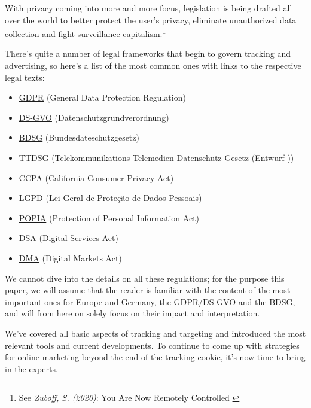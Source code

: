 With privacy coming into more and more focus, legislation is being drafted all over the world to better protect the user's privacy, eliminate unauthorized data collection and fight surveillance capitalism.\footnote{See \textit{Zuboff, S. (2020)}: You Are Now Remotely Controlled \cite{surveillance}} 

There's quite a number of legal frameworks that begin to govern tracking and advertising, so here's a list of the most common ones with links to the respective legal texts:

\begin{itemize}
 \item \href{https://gdpr-info.eu/}{GDPR} (General Data Protection Regulation)
 \item \href{https://www.datenschutz-grundverordnung.eu/}{DS-GVO} (Datenschutzgrundverordnung)
 \item \href{https://dsgvo-gesetz.de/bdsg/}{BDSG} (Bundesdateschutzgesetz)
 \item \href{https://dsgvo-gesetz.de/ttdsg/}{TTDSG} (Telekommunikations-Telemedien-Datenschutz-Gesetz (Entwurf ))
 \item \href{https://oag.ca.gov/privacy/ccpa}{CCPA} (California Consumer Privacy Act)
 \item \href{https://www.lgpdbrasil.com.br/}{LGPD} (Lei Geral de Proteção de Dados Pessoais)
 \item \href{https://popia.co.za/}{POPIA} (Protection of Personal Information Act)
 \item \href{https://ec.europa.eu/info/strategy/priorities-2019-2024/europe-fit-digital-age/digital-services-act-ensuring-safe-and-accountable-online-environment_en}{DSA} (Digital Services Act)
 \item \href{https://ec.europa.eu/info/strategy/priorities-2019-2024/europe-fit-digital-age/digital-markets-act-ensuring-fair-and-open-digital-markets_en}{DMA} (Digital Markets Act)
\end{itemize}

We cannot dive into the details on all these regulations; for the purpose this paper, we will assume that the reader is familiar with the content of the most important ones for Europe and Germany, the GDPR/DS-GVO and the BDSG, and will from here on solely focus on their impact and interpretation.

We've covered all basic aspects of tracking and targeting and introduced the most relevant tools and current developments. To continue to come up with strategies for online marketing beyond the end of the tracking cookie, it's now time to bring in the experts.
